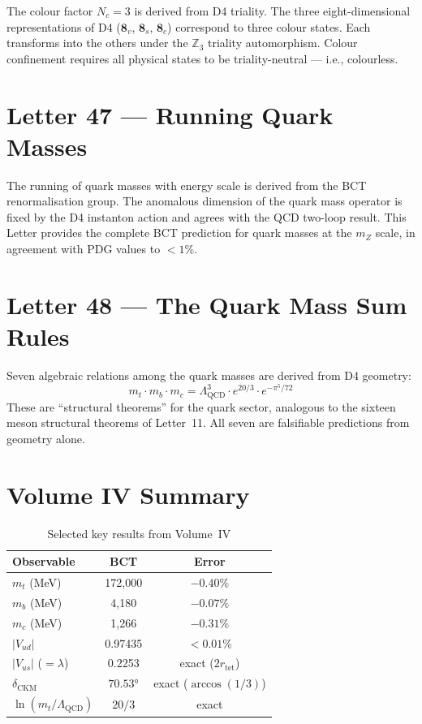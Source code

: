 \documentclass[aps,prl,twocolumn,showpacs,preprintnumbers]{revtex4-2}
\newcommand{\rtet}{r_{\mathrm{tet}}}
\newcommand{\LQCD}{\Lambda_{\mathrm{QCD}}}
\begin{document}
\medskip
The colour factor $N_c = 3$ is derived from D4 triality. The three
eight-dimensional representations of D4 ($\mathbf{8}_v$, $\mathbf{8}_s$,
$\mathbf{8}_c$) correspond to three colour states. Each transforms
into the others under the $\mathbb{Z}_3$ triality automorphism. Colour
confinement requires all physical states to be triality-neutral ---
i.e., colourless.

\section{Letter 47 --- Running Quark Masses}

\medskip
The running of quark masses with energy scale is derived from the
BCT renormalisation group. The anomalous dimension of the quark mass
operator is fixed by the D4 instanton action and agrees with the
QCD two-loop result. This Letter provides the complete BCT prediction
for quark masses at the $m_Z$ scale, in agreement with PDG values
to $<1\%$.

\section{Letter 48 --- The Quark Mass Sum Rules}

\medskip
Seven algebraic relations among the quark masses are derived from
D4 geometry:
\begin{equation}
m_t \cdot m_b \cdot m_c = \LQCD^3 \cdot e^{20/3} \cdot e^{-\pi^5/72}
\end{equation}
These are ``structural theorems'' for the quark sector, analogous
to the sixteen meson structural theorems of Letter~11. All seven
are falsifiable predictions from geometry alone.

\section*{Volume IV Summary}

\begin{table}[h]
\centering
\caption{Selected key results from Volume~IV}
\begin{tabular}{lcc}
\toprule
Observable & BCT & Error \\
\midrule
$m_t$ (MeV) & 172{,}000 & $-0.40\%$ \\
$m_b$ (MeV) & 4{,}180 & $-0.07\%$ \\
$m_c$ (MeV) & 1{,}266 & $-0.31\%$ \\
$|V_{ud}|$ & 0.97435 & $<0.01\%$ \\
$|V_{us}|$ ($=\lambda$) & 0.2253 & exact ($2\rtet$) \\
$\delta_{\mathrm{CKM}}$ & $70.53°$ & exact ($\arccos(1/3)$) \\
$\ln(m_t/\LQCD)$ & $20/3$ & exact \\
\bottomrule
\end{tabular}
\end{table}
\end{document}
